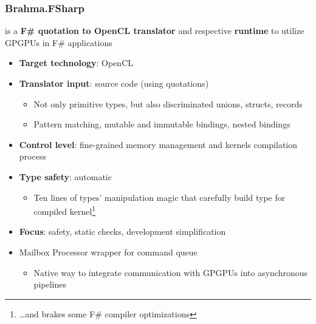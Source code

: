\documentclass[xcolor=table,aspectratio=169]{beamer}
\begin{document}

\begin{frame}[fragile]
  \frametitle{Brahma.FSharp}
  is a \textbf{F\# quotation to OpenCL translator} and respective \textbf{runtime} to utilize GPGPUs in F\# applications
  \begin{itemize}
    \item \textbf{Target technology}: OpenCL
    \item \textbf{Translator input}: source code (using quotations)
    \begin{itemize}
      \item Not only primitive types, but also discriminated unions, structs, records
      \item Pattern matching, mutable and immutable bindings, nested bindings
    \end{itemize}
    \item \textbf{Control level}: fine-grained memory management and kernels compilation process 
    \item \textbf{Type safety}: automatic
    \begin{itemize}
      \item Ten lines of types' manipulation magic that carefully build type for compiled kernel\footnote{\ldots and brakes some F\# compiler optimizations}
    \end{itemize}
    \item \textbf{Focus}: safety, static checks, development simplification
    \item Mailbox Processor wrapper for command queue
    \begin{itemize}
      \item Native way to integrate communication with GPGPUs into asynchronous pipelines
    \end{itemize}  
  \end{itemize}
\end{frame}
\end{document}
